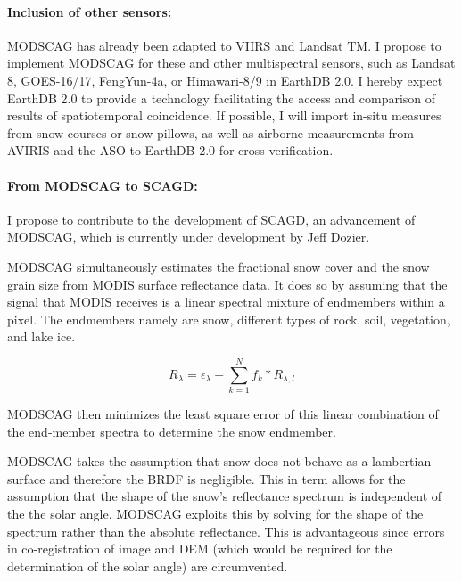 \documentclass[letterpaper, parskip=half]{scrartcl}
\begin{document}
\paragraph{Inclusion of other sensors:}
MODSCAG has already been adapted to VIIRS and Landsat TM. I propose to implement MODSCAG for these and other multispectral sensors, such as Landsat 8, \gls{GOES}-16/17, FengYun-4a, or Himawari-8/9 in EarthDB 2.0. I hereby expect EarthDB 2.0 to provide a technology facilitating the access and comparison of results of spatiotemporal coincidence. If possible, I will import in-situ measures from snow courses or snow pillows, as well as airborne measurements from \gls{AVIRIS} and the \gls{ASO} to EarthDB 2.0 for cross-verification.

\paragraph{From \gls{MODSCAG} to \gls{SCAGD}:}
I propose to contribute to the development of \gls{SCAGD}, an advancement of \gls{MODSCAG}, which is currently under development by Jeff Dozier.

MODSCAG simultaneously estimates the fractional snow cover and the snow grain size \citep{Painter2009} from MODIS surface reflectance data. It does so by assuming that the signal that MODIS receives is a linear spectral mixture of endmembers within a pixel. The endmembers namely are snow, different types of rock, soil, vegetation, and lake ice.

\begin{equation}
 R_\lambda = \epsilon_{\lambda} + \sum_{k=1}^N f_k* R_{\lambda, l}
\end{equation}

MODSCAG then minimizes the least square error of this linear combination of the end-member spectra to determine the snow endmember.

MODSCAG takes the assumption that snow does not behave as a lambertian surface and therefore the \gls{BRDF} is negligible. 
This in term allows for the assumption that the shape of the snow's reflectance spectrum is independent of the the solar angle. MODSCAG exploits this by solving for the shape of the spectrum rather than the absolute reflectance. This is advantageous since errors in co-registration of image and DEM (which would be required for the determination of the solar angle) are circumvented.
\end{document}
